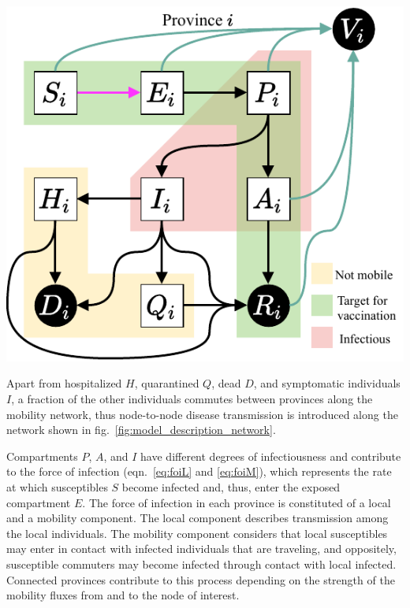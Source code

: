 \begin{marginfigure}
\centering
\includegraphics{fig_italy-ocp/figures/OCPItalydrawio2.pdf}
    \label{fig:model_description_diag}
\end{marginfigure}


Apart from hospitalized $H$, quarantined $Q$, dead $D$, and symptomatic individuals $I$, a fraction of the other individuals commutes between provinces along the mobility network, thus node-to-node disease transmission is introduced along the network shown in fig.~\ref{fig:model_description_network}.

Compartments $P$, $A$, and $I$ have different degrees of infectiousness and contribute to the force of infection (eqn.~\eqref{eq:foiL} and \eqref{eq:foiM}), which represents the rate at which susceptibles $S$ become infected and, thus, enter the exposed compartment $E$. The force of infection in each province is constituted of a local and a mobility component. The local component describes transmission among the local individuals. The mobility component considers that local susceptibles may enter in contact with infected individuals that are traveling, and oppositely, susceptible commuters may become infected through contact with local infected. Connected provinces contribute to this process depending on the strength of the mobility fluxes from and to the node of interest.

